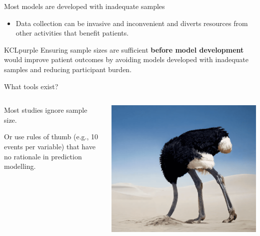 \documentclass[11pt]{beamer}
\newcommand{\bgap}{\vspace{0.8em}}
\begin{document}
\begin{frame}[t]{Most models are developed with inadequate samples}
\begin{itemize}
		\item Data collection can be invasive and inconvenient and diverts
		      resources from other activities that benefit patients.

	\end{itemize}

	\begin{cbox}{KCLpurple}{}
		\large
		Ensuring sample sizes are sufficient \textbf{before model development}
		would improve patient outcomes by avoiding models developed with
		inadequate samples and reducing participant burden.
	\end{cbox}

\end{frame}

\begin{frame}[t]{What tools exist?}
	\centering
	\begin{columns}
		\begin{column}[c]{0.6\textwidth}
			\centering
			Most studies ignore sample size.
			\bgap%

			Or use rules of thumb (e.g., 10 events per variable) that have no
			rationale in prediction modelling\autocite{vansmeden2016}.
		\end{column}
		\begin{column}[c]{0.4\textwidth}
			\includegraphics[width=\textwidth]{figures/bury-head.png}%
		\end{column}
	\end{columns}


\end{frame}
\end{document}
